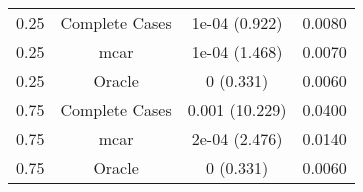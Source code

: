 \begin{table}[ht]
\centering
\begin{tabular}{cccc}
  \hline
  \hline
0.25 & Complete Cases & 1e-04 (0.922) & 0.0080 \\ 
  0.25 & mcar & 1e-04 (1.468) & 0.0070 \\ 
  0.25 & Oracle & 0 (0.331) & 0.0060 \\ 
  0.75 & Complete Cases & 0.001 (10.229) & 0.0400 \\ 
  0.75 & mcar & 2e-04 (2.476) & 0.0140 \\ 
  0.75 & Oracle & 0 (0.331) & 0.0060 \\ 
   \hline
\end{tabular}
\end{table}
